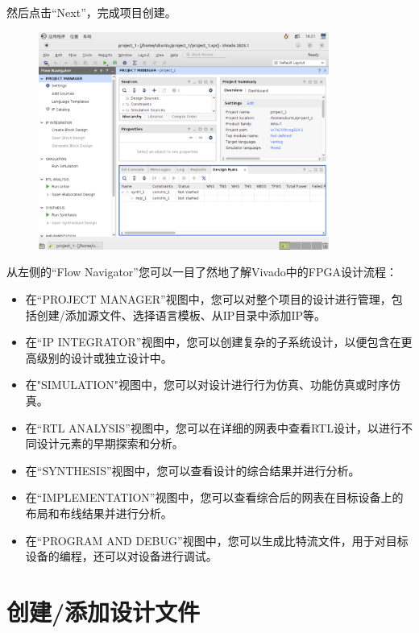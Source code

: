 \documentclass{ctexart}
\begin{document}
然后点击“Next”，完成项目创建。

\begin{figure}[H]
    \centering
    \includegraphics[width=0.85\textwidth]{lab0/16.png}
\end{figure}

从左侧的“Flow Navigator”您可以一目了然地了解Vivado中的FPGA设计流程：

\begin{itemize}
    \item 在“PROJECT MANAGER”视图中，您可以对整个项目的设计进行管理，包括创建/添加源文件、选择语言模板、从IP目录中添加IP等。
    \item 在“IP INTEGRATOR”视图中，您可以创建复杂的子系统设计，以便包含在更高级别的设计或独立设计中。
    \item 在"SIMULATION"视图中，您可以对设计进行行为仿真、功能仿真或时序仿真。
    \item 在“RTL ANALYSIS”视图中，您可以在详细的网表中查看RTL设计，以进行不同设计元素的早期探索和分析。
    \item 在“SYNTHESIS”视图中，您可以查看设计的综合结果并进行分析。
    \item 在“IMPLEMENTATION”视图中，您可以查看综合后的网表在目标设备上的布局和布线结果并进行分析。
    \item 在“PROGRAM AND DEBUG”视图中，您可以生成比特流文件，用于对目标设备的编程，还可以对设备进行调试。
\end{itemize}


\section{创建/添加设计文件}
\end{document}
